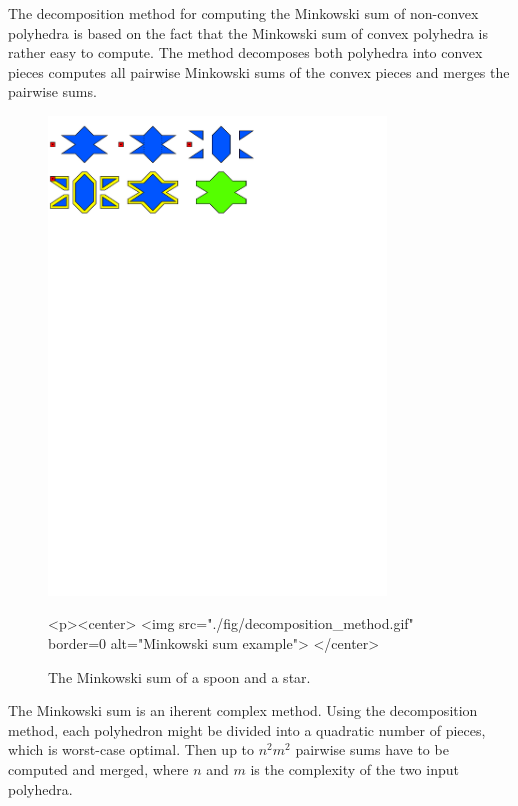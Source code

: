 The decomposition method for computing the Minkowski sum of non-convex
polyhedra is based on the fact that the Minkowski sum of convex
polyhedra is rather easy to compute. The method decomposes both
polyhedra into convex pieces computes all pairwise Minkowski sums of
the convex pieces and merges the pairwise sums.

\begin{figure}
  \begin{ccTexOnly}
    \begin{center}
      \includegraphics[width=0.8\textwidth]{Minkowski_sum_3/fig/decomposition_method}
    \end{center}
  \end{ccTexOnly}
  \begin{ccHtmlOnly}
    <p><center>
    <img src="./fig/decomposition_method.gif" border=0 alt="Minkowski sum example">
    </center>
  \end{ccHtmlOnly}
  \caption{The Minkowski sum of a spoon and a star.}
\end{figure}

The Minkowski sum is an iherent complex method. Using the
decomposition method, each polyhedron might be divided into a
quadratic number of pieces, which is worst-case optimal. Then up to
$n^2m^2$ pairwise sums have to be computed and merged, where $n$ and
$m$ is the complexity of the two input polyhedra.

